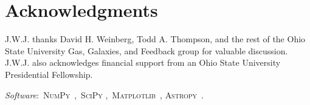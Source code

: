 \documentclass[ms.tex]{subfiles}
\begin{document}
\section{Acknowledgments}
\label{sec:acknowledgments}

J.W.J. thanks David H. Weinberg, Todd A. Thompson, and the rest of the Ohio
State University Gas, Galaxies, and Feedback group for valuable discussion.
J.W.J. also acknowledges financial support from an Ohio State University
Presidential Fellowship.
\par\null\par\noindent
\textit{Software}:~\textsc{NumPy}~\citep{Harris2020},~\textsc{SciPy}
\citep{Virtanen2020},~\textsc{Matplotlib}~\citep{Hunter2007},
\textsc{Astropy}~\citep{Astropy2013, Astropy2018, Astropy2022}.
\end{document}
